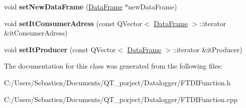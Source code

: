 \begin{DoxyCompactItemize}
void {\bfseries set\+New\+Data\+Frame} (\hyperlink{class_data_frame}{Data\+Frame} $\ast$new\+Data\+Frame)
\item 
\mbox{\label{class_f_t_d_i_function_abb1c121f5beb7acd92b99294f33e6ac7}} 
void {\bfseries set\+It\+Consumer\+Adress} (const Q\+Vector$<$ \hyperlink{class_data_frame}{Data\+Frame} $>$\+::iterator \&it\+Consumer\+Adress)
\item 
\mbox{\label{class_f_t_d_i_function_af8b813dfa79d10d40c9a8a5165153785}} 
void {\bfseries set\+It\+Producer} (const Q\+Vector$<$ \hyperlink{class_data_frame}{Data\+Frame} $>$\+::iterator \&it\+Producer)
\end{DoxyCompactItemize}


The documentation for this class was generated from the following files\+:\begin{DoxyCompactItemize}
\item 
C\+:/\+Users/\+Sebastien/\+Documents/\+Q\+T\+\_\+porject/\+Datalogger/F\+T\+D\+I\+Function.\+h\item 
C\+:/\+Users/\+Sebastien/\+Documents/\+Q\+T\+\_\+porject/\+Datalogger/F\+T\+D\+I\+Function.\+cpp\end{DoxyCompactItemize}
